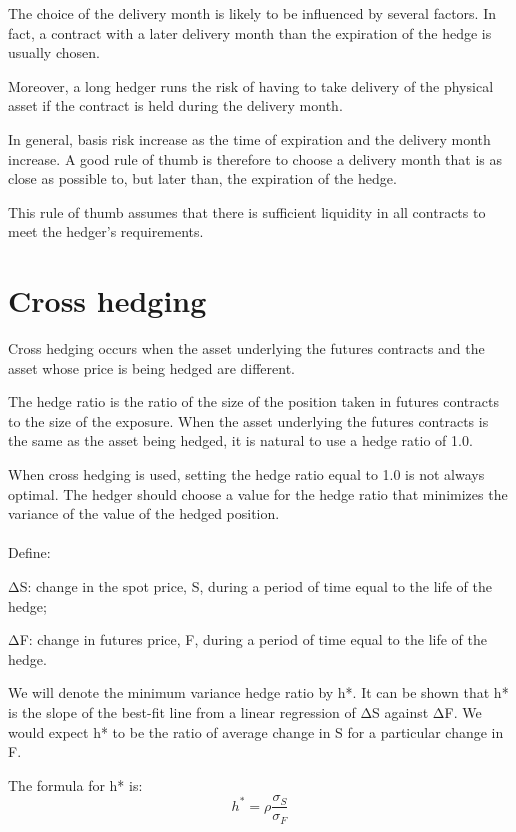 \documentclass{article}
\begin{document}
The choice of the delivery month is likely to be influenced by several factors.
In fact, a contract with a later delivery month than the expiration of the hedge is usually chosen.

Moreover, a long hedger runs the risk of having to take delivery of the physical asset if the contract is held during the delivery month.

In general, basis risk increase as the time of expiration and the delivery month increase. A good rule of thumb is therefore to choose a delivery month that is as close as possible to, but later than, the expiration of the hedge.

This rule of thumb assumes that there is sufficient liquidity in all contracts to meet the hedger's requirements.


\section{Cross hedging }
\hspace*{\fill}

Cross hedging occurs when the asset underlying the futures contracts and the asset whose price is being hedged are different.

The hedge ratio is the ratio of the size of the position taken in futures contracts to the size of the exposure. When the asset underlying the futures contracts is the same as the asset being hedged, it is natural to use a hedge ratio of 1.0.

When cross hedging is used, setting the hedge ratio equal to 1.0 is not always optimal. The hedger should choose a value for the hedge ratio that minimizes the variance of the value of the hedged position.
\\ \hspace*{\fill}
\\
Define:

ΔS: change in the spot price, S, during a period of time equal to the life of the hedge;

ΔF: change in futures price, F, during a period of time equal to the life of the hedge.

We will denote the minimum variance hedge ratio by h*. It can be shown that h* is the slope of the best-fit line from a linear regression of ΔS against ΔF. We would expect h* to be the ratio of average change in S for a particular change in F.

The formula for h* is:
\[
h^*=\rho\frac{\sigma_S}{\sigma_F}
\]
\end{document}
